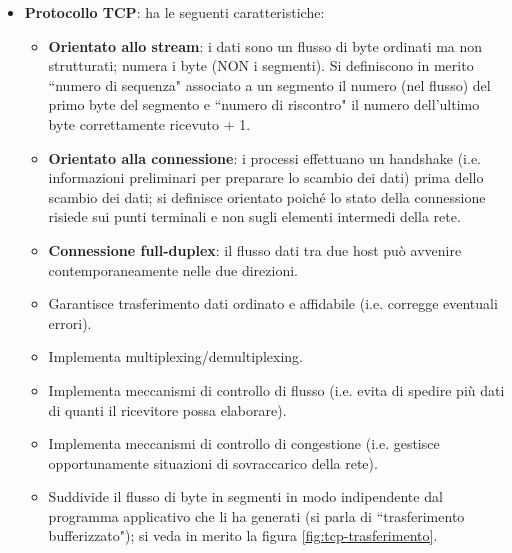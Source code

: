 \documentclass[11pt, italian, openany]{book}
\begin{document}
\begin{sloppypar}
\begin{itemize}[topsep=0pt, itemsep=0pt, parsep=0pt]
	\item \textbf{Protocollo TCP}: ha le seguenti caratteristiche:
	\begin{itemize}[topsep=0pt, itemsep=0pt, parsep=0pt]
		\item \textbf{Orientato allo stream}: i dati sono un flusso di byte ordinati ma non strutturati; numera i byte (NON i segmenti). Si
		definiscono in merito ``numero di sequenza" associato a un segmento il numero (nel flusso) del primo byte del segmento e ``numero di
		riscontro" il numero dell'ultimo byte correttamente ricevuto + 1.
		\item \textbf{Orientato alla connessione}: i processi effettuano un handshake (i.e. informazioni preliminari per preparare lo scambio
		dei dati) prima dello scambio dei dati; si definisce orientato poich\'e lo stato della connessione risiede sui punti terminali e non
		sugli elementi intermedi della rete.
		\item \textbf{Connessione full-duplex}: il flusso dati tra due host pu\`o avvenire contemporaneamente nelle due direzioni.
		\item Garantisce trasferimento dati ordinato e affidabile (i.e. corregge eventuali errori).
		\item Implementa multiplexing/demultiplexing.
		\item Implementa meccanismi di controllo di flusso (i.e. evita di spedire pi\`u dati di quanti il ricevitore possa elaborare).
		\item Implementa meccanismi di controllo di congestione (i.e. gestisce opportunamente situazioni di sovraccarico della rete).
		\item Suddivide il flusso di byte in segmenti in modo indipendente dal programma applicativo che li ha generati (si parla di ``trasferimento
		bufferizzato"); si veda in merito la figura \ref{fig:tcp-trasferimento}.
	\end{itemize}


\end{itemize}
\end{sloppypar}
\end{document}
